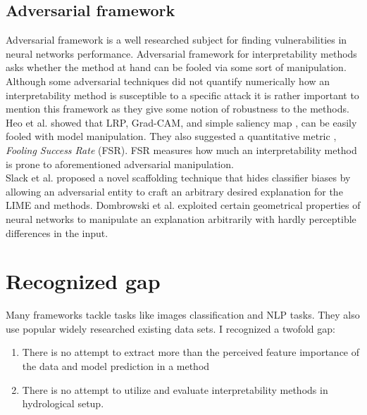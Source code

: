 \documentclass[12pt]{report}
\begin{document}
\newpage

\subsection{Adversarial framework}

Adversarial framework is a well researched subject for finding vulnerabilities in neural networks performance. Adversarial framework for interpretability methods asks whether the method at hand can be fooled via some sort of manipulation. Although some adversarial techniques did not quantify numerically how an interpretability method is susceptible to a specific attack it is rather important to mention this framework as they give some notion of robustness to the methods.\\

Heo et al. \cite{DBLP:journals/corr/abs-1902-02041} showed that LRP, Grad-CAM, and simple saliency map , can be easily fooled with model manipulation. They also suggested a quantitative metric , \textit{Fooling Success Rate} (FSR). FSR measures how much an interpretability method is prone to aforementioned adversarial manipulation.\\


Slack et al. \cite{DBLP:journals/corr/abs-1911-02508} proposed a novel scaffolding technique that hides classifier biases by allowing an adversarial entity to craft an arbitrary desired explanation for the LIME and methods. Dombrowski et al. \cite{https://doi.org/10.48550/arxiv.1906.07983} exploited certain geometrical properties of neural
networks to manipulate an explanation arbitrarily with hardly perceptible differences in the input.

\newpage
\section{Recognized gap}

Many frameworks tackle tasks like images classification and NLP tasks. They also use popular widely researched existing data sets. I recognized a twofold gap:
\begin{enumerate}
	\item There is no attempt to extract more than the perceived feature importance of the data and model prediction in a method
	\item There is no attempt to utilize and evaluate interpretability methods in hydrological setup.
\end{enumerate}
\end{document}
